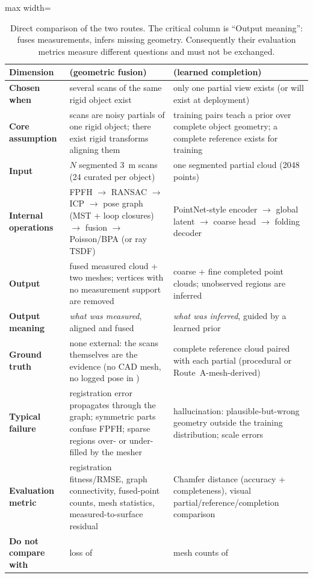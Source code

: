 \begin{table}[H]
  \centering
  \small
  \begin{adjustbox}{max width=\textwidth}
  \begin{tabular}{@{}p{2.9cm}p{5.6cm}p{5.6cm}@{}}
    \toprule
    Dimension & \routeA{} (geometric fusion) & \routeB{} (learned completion) \\
    \midrule
    \textbf{Chosen when} & several scans of the same rigid object exist &
    only one partial view exists (or will exist at deployment) \\
    \textbf{Core assumption} & scans are noisy partials of one rigid object;
    there exist rigid transforms aligning them & training pairs teach a prior
    over complete object geometry; a complete reference exists for training \\
    \textbf{Input} & $N$ segmented 3~m scans (24 curated per object) &
    one segmented partial cloud (2048 points) \\
    \textbf{Internal operations} & FPFH $\to$ RANSAC $\to$ ICP $\to$ pose graph
    (MST + loop closures) $\to$ fusion $\to$ Poisson/BPA (or ray TSDF) &
    PointNet-style encoder $\to$ global latent $\to$ coarse head $\to$ folding
    decoder \\
    \textbf{Output} & fused measured cloud + two meshes; vertices with no
    measurement support are removed & coarse + fine completed point clouds;
    unobserved regions are inferred \\
    \textbf{Output meaning} & \emph{what was measured}, aligned and fused &
    \emph{what was inferred}, guided by a learned prior \\
    \textbf{Ground truth} & none external: the scans themselves are the
    evidence (no CAD mesh, no logged pose in \suop{}) & complete reference
    cloud paired with each partial (procedural or Route~A-mesh-derived) \\
    \textbf{Typical failure} & registration error propagates through the
    graph; symmetric parts confuse FPFH; sparse regions over- or under-filled
    by the mesher & hallucination: plausible-but-wrong geometry outside the
    training distribution; scale errors \\
    \textbf{Evaluation metric} & registration fitness/RMSE, graph
    connectivity, fused-point counts, mesh statistics, measured-to-surface
    residual & Chamfer distance (accuracy + completeness), visual
    partial/reference/completion comparison \\
    \textbf{Do not compare with} & \chd{} loss of \routeB{} & mesh counts of
    \routeA{} \\
    \bottomrule
  \end{tabular}
  \end{adjustbox}
  \caption{Direct comparison of the two routes. The critical column is
  ``Output meaning'': \routeA{} fuses measurements, \routeB{} infers missing
  geometry. Consequently their evaluation metrics measure different questions
  and must not be exchanged.}
  \label{tab:route_comparison}
\end{table}

